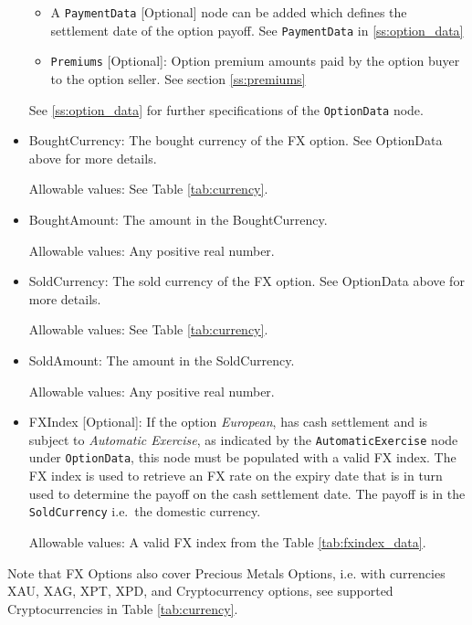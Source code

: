 \begin{itemize}
\begin{itemize}
\item A \lstinline!PaymentData! [Optional] node can be added which defines the settlement date of the option payoff. See  \lstinline!PaymentData! in \ref{ss:option_data}

\item \lstinline!Premiums! [Optional]: Option premium amounts paid by the option buyer to the option seller. See section \ref{ss:premiums}


\end{itemize}

 See \ref{ss:option_data} for further specifications of the \lstinline!OptionData! node.


\item BoughtCurrency: The bought currency of the FX option. See OptionData above for more details.

Allowable values: See Table \ref{tab:currency}.

\item BoughtAmount: The amount in the BoughtCurrency.

Allowable values: Any positive real number.

\item SoldCurrency: The sold currency of the FX option. See OptionData above for more details.

Allowable values: See Table \ref{tab:currency}.

\item SoldAmount: The amount in the SoldCurrency.

Allowable values: Any positive real number.

\item FXIndex [Optional]: If the option \textit{European}, has cash settlement and is subject to \textit{Automatic Exercise}, as indicated by the \lstinline!AutomaticExercise! node under \lstinline!OptionData!, this node must be populated with a valid FX index. The FX index is used to retrieve an FX rate on the expiry date that is in turn used to determine the payoff on the cash settlement date. The payoff is in the \lstinline!SoldCurrency! i.e.\ the domestic currency.

Allowable values: A valid FX index from the Table \ref{tab:fxindex_data}.

\end{itemize}

Note that FX Options also cover Precious Metals Options, i.e. with currencies XAU, XAG, XPT, XPD, and Cryptocurrency options,  see supported Cryptocurrencies in Table \ref{tab:currency}.